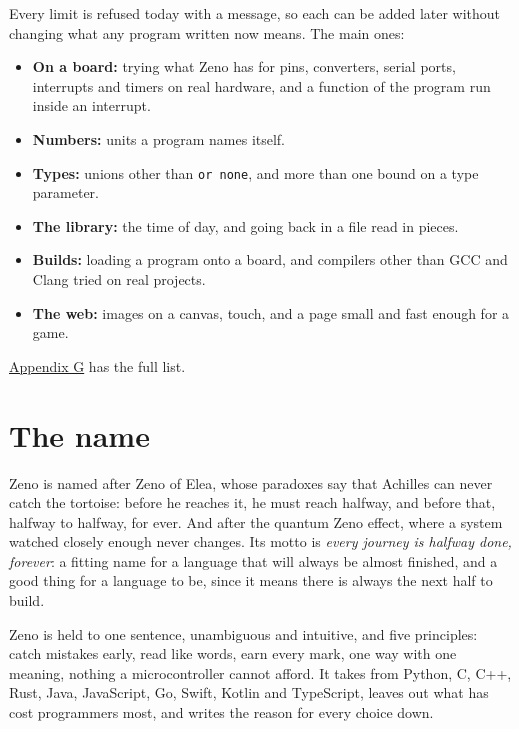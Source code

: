 Every limit is refused today with a message, so each can be added later
without changing what any program written now means. The main ones:

\begin{itemize}
\item \textbf{On a board:} trying what Zeno has for pins, converters,
  serial ports, interrupts and timers on real hardware, and a function
  of the program run inside an interrupt.
\item \textbf{Numbers:} units a program names itself.
\item \textbf{Types:} unions other than \verb|or none|, and more than
  one bound on a type parameter.
\item \textbf{The library:} the time of day, and going back in a
  file read in pieces.
\item \textbf{Builds:} loading a program onto a board, and compilers
  other than GCC and Clang tried on real projects.
\item \textbf{The web:} images on a canvas, touch, and a page small
  and fast enough for a game.
\end{itemize}

\hyperref[app-limits]{Appendix G} has the full list.

\section{The name}

Zeno is named after Zeno of Elea, whose paradoxes say that Achilles can
never catch the tortoise: before he reaches it, he must reach halfway,
and before that, halfway to halfway, for ever. And after the quantum
Zeno effect, where a system watched closely enough never changes. Its
motto is \emph{every journey is halfway done, forever}: a fitting name
for a language that will always be almost finished, and a good thing
for a language to be, since it means there is always the next half to
build.

\begin{summary}
Zeno is held to one sentence, unambiguous and intuitive, and five
principles: catch mistakes early, read like words, earn every mark, one
way with one meaning, nothing a microcontroller cannot afford. It takes
from Python, C, C++, Rust, Java, JavaScript, Go, Swift, Kotlin and
TypeScript, leaves out what has cost programmers most, and writes the
reason for every choice down.
\end{summary}
